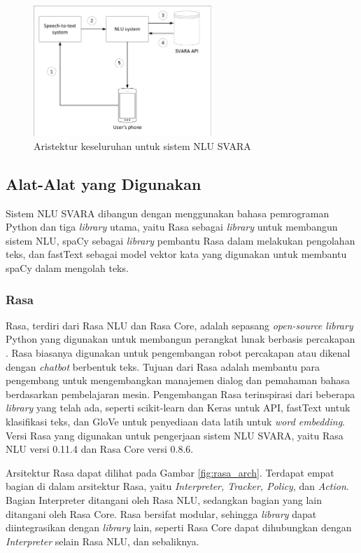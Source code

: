 \begin{figure}[H]
	\centering
	\includegraphics[width=0.6\textwidth, trim=2 2 2 2, clip]{resources/3-svara_arch.pdf}
	\caption{Aristektur keseluruhan untuk sistem NLU SVARA}
	\label{fig:svara_arch}
\end{figure}

\subsection{Alat-Alat yang Digunakan}

Sistem NLU SVARA dibangun dengan menggunakan bahasa pemrograman Python dan tiga \textit{library} utama, yaitu Rasa sebagai \textit{library} untuk membangun sistem NLU, spaCy sebagai \textit{library} pembantu Rasa dalam melakukan pengolahan teks, dan fastText sebagai model vektor kata yang digunakan untuk membantu spaCy dalam mengolah teks.

\subsubsection{Rasa}

Rasa, terdiri dari Rasa NLU dan Rasa Core, adalah sepasang \textit{open-source library} Python yang digunakan untuk membangun perangkat lunak berbasis percakapan \parencite{bocklisch2017rasa}. Rasa biasanya digunakan untuk pengembangan robot percakapan atau dikenal dengan \textit{chatbot} berbentuk teks. Tujuan dari Rasa adalah membantu para pengembang untuk mengembangkan manajemen dialog dan pemahaman bahasa berdasarkan pembelajaran mesin. Pengembangan Rasa terinspirasi dari beberapa \textit{library} yang telah ada, seperti scikit-learn dan Keras untuk API, fastText untuk klasifikasi teks, dan GloVe untuk penyediaan data latih untuk \textit{word embedding}. Versi Rasa yang digunakan untuk pengerjaan sistem NLU SVARA, yaitu Rasa NLU versi 0.11.4 dan Rasa Core versi 0.8.6.

Arsitektur Rasa dapat dilihat pada Gambar \ref{fig:rasa_arch}. Terdapat empat bagian di dalam arsitektur Rasa, yaitu \textit{Interpreter, Tracker, Policy}, dan \textit{Action}. Bagian Interpreter ditangani oleh Rasa NLU, sedangkan bagian yang lain ditangani oleh Rasa Core. Rasa bersifat modular, sehingga \textit{library} dapat diintegrasikan dengan \textit{library} lain, seperti Rasa Core dapat dihubungkan dengan \textit{Interpreter} selain Rasa NLU, dan sebaliknya.


